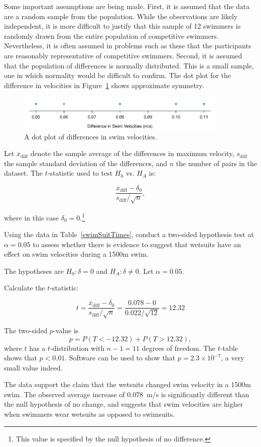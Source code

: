 Some important assumptions are being made. First, it is assumed that the data are a random sample from the population. While the observations are likely independent, it is more difficult to justify that this sample of 12 swimmers is randomly drawn from the entire population of competitive swimmers. Nevertheless, it is often assumed in problems such as these that the participants are reasonably representative of competitive swimmers. Second, it is assumed that the population of differences is normally distributed. This is a small sample, one in which normality would be difficult to confirm. The dot plot for the difference in velocities in Figure~\ref{swimDotPlot} shows approximate symmetry.

\begin{figure}[h]
	\centering
	\includegraphics[width=0.9\textwidth]{ch_inference_for_means_oi_biostat/figures/swimDotPlot/swimDotPlot}
	\caption{A dot plot of differences in swim velocities.}
	\label{swimDotPlot}
\end{figure}


Let $\overline{x}_{\text{diff}}$ denote the sample average of the differences in maximum velocity, $s_{\text{diff}}$ the sample standard deviation of the differences, and $n$ the number of pairs in the dataset. The $t$-statistic used to test $H_0$ vs. $H_A$ is: 

\[\frac{\overline{x}_{\text{diff}} - \delta_0} {s_{\text{diff}}/\sqrt{n}},\]

where in this case $\delta_0 = 0$.\footnote{This value is specified by the null hypothesis of no difference.}

\begin{example}{Using the data in Table~\ref{swimSuitTimes}, conduct a two-sided hypothesis test at $\alpha = 0.05$ to assess whether there is evidence to suggest that wetsuits have an effect on swim velocities during a 1500m swim.}

The hypotheses are $H_0: \delta = 0$ and $H_A: \delta \neq 0$. Let $\alpha = 0.05$. 

Calculate the $t$-statistic:

\[t = \frac{\overline{x}_{\text{diff}} - \delta_0} {s_{\text{diff}}/\sqrt{n}} = \frac{0.078 - 0}{0.022/\sqrt{12}} = 12.32\]

The two-sided $p$-value is
$$ p = P(T < -\text{12.32}) + P(T > \text{12.32}), $$
where $t$ has a $t$-distribution with $n-1 = 11$  degrees of freedom.
The $t$-table shows that $p < 0.01$. Software can be used to show that $p = 2.3 \times 10^{-7}$, a very small value indeed.  
	
The data support the claim that the wetsuits changed swim velocity in a 1500m swim. The observed average increase of 0.078~m/s is significantly different than the null hypothesis of no change, and suggests that swim velocities are higher when swimmers wear wetsuits as opposed to swimsuits.	

\end{example}

